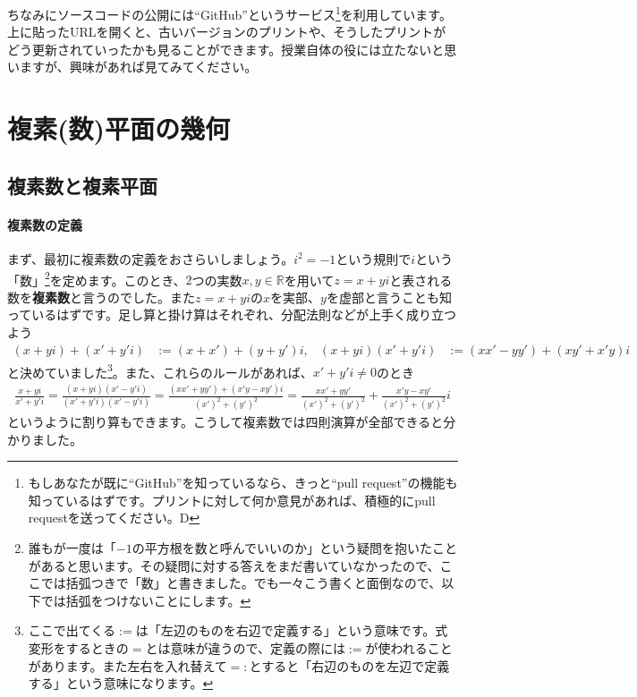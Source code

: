 ちなみにソースコードの公開には``GitHub''というサービス\footnote{もしあなたが既に``GitHub''を知っているなら、きっと``pull request''の機能も知っているはずです。プリントに対して何か意見があれば、積極的にpull requestを送ってください。\textsf{\raisebox{1pt}{:}D}}を利用しています。上に貼ったURLを開くと、古いバージョンのプリントや、そうしたプリントがどう更新されていったかも見ることができます。授業自体の役には立たないと思いますが、興味があれば見てみてください。

\section{複素(数)平面の幾何}

\subsection{複素数と複素平面}

\paragraph{複素数の定義}

まず、最初に複素数の定義をおさらいしましょう。$i^2=-1$という規則で$i$という「数」\footnote{誰もが一度は「$-1$の平方根を数と呼んでいいのか」という疑問を抱いたことがあると思います。その疑問に対する答えをまだ書いていなかったので、ここでは括弧つきで「数」と書きました。でも一々こう書くと面倒なので、以下では括弧をつけないことにします。}を定めます。このとき、$2$つの実数$x,y\in\mathbb{R}$を用いて$z=x+yi$と表される数を\textbf{複素数}と言うのでした。また$z=x+yi$の$x$を実部、$y$を虚部と言うことも知っているはずです。足し算と掛け算はそれぞれ、分配法則などが上手く成り立つよう
\begin{align*}
(x+yi) + (x'+y'i) &:= (x+x')+(y+y')i, &  (x+yi)(x'+y'i) &:= (xx' - yy') + (xy'+x'y)i
\end{align*}
と決めていました\footnote{ここで出てくる$:=$は「左辺のものを右辺で定義する」という意味です。式変形をするときの$=$とは意味が違うので、定義の際には$:=$が使われることがあります。また左右を入れ替えて$=:$とすると「右辺のものを左辺で定義する」という意味になります。}。また、これらのルールがあれば、$x'+y'i\neq 0$のとき
\begin{align*}
\frac{x+yi}{x'+y'i}
= \frac{(x+yi)(x'-y'i)}{(x'+y'i)(x'-y'i)} = \frac{(xx'+yy')+(x'y-xy')i}{(x')^2+(y')^2}
= \frac{xx'+yy'}{(x')^2+(y')^2} + \frac{x'y-xy'}{(x')^2+(y')^2}i
\end{align*}
というように割り算もできます。こうして複素数では四則演算が全部できると分かりました。

